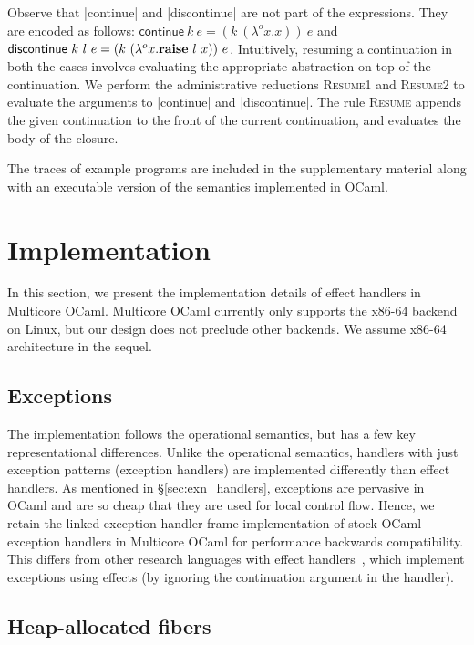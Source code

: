 \documentclass[sigplan,10pt,review,anonymous]{acmart}\settopmatter{printfolios=true,printccs=false,printacmref=false}
\newcommand{\olam}[2]{\lambda^o #1. #2}
\newcommand{\kw}[1]{\text{\bf #1}}
\newcommand{\throw}[2]{\kw{raise} ~#1 ~#2}
\begin{document}
Observe that |continue| and |discontinue| are not part of the expressions. They
are encoded as follows: $\textsf{continue} ~k ~e = (k ~(\olam{x}{x})) ~e$ and
$\textsf{discontinue} ~k ~l ~e = (k ~(\olam{x}{\throw{l}{x}})) ~e$.
Intuitively, resuming a continuation in both the cases involves evaluating the
appropriate abstraction on top of the continuation. We perform the
administrative reductions \textsc{Resume1} and \textsc{Resume2} to evaluate the
arguments to |continue| and |discontinue|. The rule \textsc{Resume} appends the
given continuation to the front of the current continuation, and evaluates the
body of the closure.

The traces of example programs are included in the supplementary material along
with an executable version of the semantics implemented in OCaml.

\section{Implementation}
\label{sec:impl}

In this section, we present the implementation details of effect handlers in
Multicore OCaml. Multicore OCaml currently only supports the x86-64 backend on
Linux, but our design does not preclude other backends. We assume x86-64
architecture in the sequel.

\vspace{-2mm}
\subsection{Exceptions}

The implementation follows the operational semantics, but has a few key
representational differences. Unlike the operational semantics, handlers with
just exception patterns (exception handlers) are implemented differently than
effect handlers. As mentioned in \S\ref{sec:exn_handlers}, exceptions are
pervasive in OCaml and are so cheap that they are used for local control flow.
Hence, we retain the linked exception handler frame implementation of stock
OCaml exception handlers in Multicore OCaml for performance backwards
compatibility. This differs from other research languages with effect
handlers~\cite{Hillerstrom20,Frank,Eff}, which implement exceptions using
effects (by ignoring the continuation argument in the handler).

\vspace{-2mm}
\subsection{Heap-allocated fibers}
\end{document}
